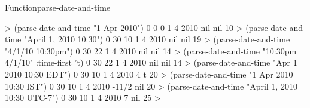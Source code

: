 \documentclass[10pt,twoside,english,pdftex]{article}
\begin{document}
\begin{functiondoc}{Function}{parse-date-and-time}
\fnexamples
%
\W\supp
\begin{example}
  > (parse-date-and-time "1 Apr 2010")
  0
  0
  0
  1
  4
  2010
  nil
  nil
  10\goodpagebreak
  > (parse-date-and-time "April 1, 2010 10:30")
  0
  30
  10
  1
  4
  2010
  nil
  nil
  19\goodpagebreak
  > (parse-date-and-time "4/1/10 10:30pm")
  0
  30
  22
  1
  4
  2010
  nil
  nil
  14
  > (parse-date-and-time "10:30pm 4/1/10" :time-first 't)
  0
  30
  22
  1
  4
  2010
  nil
  nil
  14\goodpagebreak
  > (parse-date-and-time "Apr 1 2010 10:30 EDT")
  0
  30
  10
  1
  4
  2010
  4
  t
  20\goodpagebreak
  > (parse-date-and-time "1 Apr 2010 10:30 IST")
  0
  30
  10
  1
  4
  2010
  -11/2
  nil
  20\goodpagebreak
  > (parse-date-and-time "April 1, 2010 10:30 UTC-7")
  0
  30
  10
  1
  4
  2010
  7
  nil
  25
  >
\end{example}

\end{functiondoc}

\end{document}
